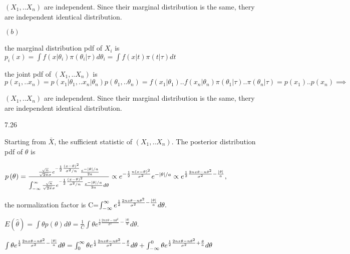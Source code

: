 \documentclass{article}
\begin{document}
$\left( X_{1},..X_{n}\right) $ are independent. Since their marginal
distribution is the same, thery are independent identical distribution.

$\left( b\right) $

the marginal distribution pdf of $X_{i}$ is $p_{i}\left( x\right) =\int
f\left( x|\theta _{i}\right) \pi \left( \theta _{i}|\tau \right) d\theta
_{i}=\int f\left( x|t\right) \pi \left( t|\tau \right) dt$

the joint pdf of $\left( X_{1},..X_{n}\right) $ is $p\left(
x_{1},..x_{n}\right) =p\left( x_{1}|\theta _{1},..x_{n}|\theta _{n}\right)
p\left( \theta _{1},..\theta _{n}\right) =f\left( x_{1}|\theta _{1}\right)
..f\left( x_{n}|\theta _{n}\right) \pi \left( \theta _{1}|\tau \right) ..\pi
\left( \theta _{n}|\tau \right) =p\left( x_{1}\right) ..p\left( x_{n}\right)
\implies $

$\left( X_{1},..X_{n}\right) $ are independent. Since their marginal
distribution is the same, thery are independent identical distribution.

7.26  

Starting from $\bar{X}$, the sufficient statistic of $\left(
X_{1},..X_{n}\right) .$ The posterior distribution pdf of $\theta $ is

$p\left( \theta \right) =\frac{\frac{\sqrt{n}}{\sqrt{2\pi }\sigma }e^{-\frac{%
1}{2}\frac{\left( x-\theta \right) ^{2}}{\sigma ^{2}/n}}\frac{e^{-\left\vert
\theta \right\vert /a}}{2a}}{\int_{-\infty }^{\infty }\frac{\sqrt{n}}{\sqrt{%
2\pi }\sigma }e^{-\frac{1}{2}\frac{\left( x-\theta \right) ^{2}}{\sigma
^{2}/n}}\frac{e^{-\left\vert \theta \right\vert /a}}{2a}d\theta }\propto e^{-%
\frac{1}{2}\frac{n\left( x-\theta \right) ^{2}}{\sigma ^{2}}}e^{-\left\vert
\theta \right\vert /a}\propto e^{\frac{1}{2}\frac{2nx\theta -n\theta ^{2}}{%
\sigma ^{2}}-\frac{\left\vert \theta \right\vert }{a}},$

the normalization factor is C=$\int_{-\infty }^{\infty }e^{\frac{1}{2}\frac{%
2nx\theta -n\theta ^{2}}{\sigma ^{2}}-\frac{\left\vert \theta \right\vert }{a%
}}d\theta .$

$E\left( \hat{\theta}\right) =\int \theta p\left( \theta \right) d\theta =%
\frac{1}{C}\int \theta e^{\frac{1}{2}\frac{2nx\theta -n\theta ^{2}}{\sigma
^{2}}-\frac{\left\vert \theta \right\vert }{a}}d\theta .$

$\int \theta e^{\frac{1}{2}\frac{2nx\theta -n\theta ^{2}}{\sigma ^{2}}-\frac{%
\left\vert \theta \right\vert }{a}}d\theta =\int_{0}^{\infty }\theta e^{%
\frac{1}{2}\frac{2nx\theta -n\theta ^{2}}{\sigma ^{2}}-\frac{\theta }{a}%
}d\theta +\int_{-\infty }^{0}\theta e^{\frac{1}{2}\frac{2nx\theta -n\theta
^{2}}{\sigma ^{2}}+\frac{\theta }{a}}d\theta $
\end{document}
